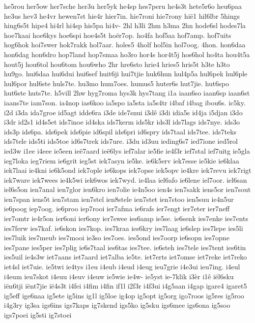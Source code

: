 he5rou
her5ow
her7sche
her3u
her5yk
he4sp
hes7peru
he4s3t
hete5r6o
heu6paa
he3us
hev3
he4vr
hewen7st
hie4r
hier7in.
hie7roni
hie7rony
hië1
hil6lbr
5hings
hing6s5t
hipe4
hi4rl
hi4sp
his5pa
hi4v-
2hl
h3li
2hm
h3ma
2hn
hode6sl
hodes7la
hoe7kaai
hoe6kys
hoe6spi
hoe4s5t
hoër7op.
ho4fa
hof5aa
hof7amp.
hof7uits
hog6hok
hoi7swer
hok7rakk
hol7aar.
holes5
4holf
hol5in
hol7oog.
4hon.
hon6daa
hon6dag
hon6dro
hop7land
hop7smaa
ho3ro
hor4s
hor4t5j
hos6hol
ho4ta
hou4t5a
hout5j
hou6tol
hou6tom
hou6who
2hr
hre6sto
hrie4
hries5
hris5t
h3te
h3to
hu9go.
hui6daa
hui6dui
hui6sef
huit6ji
hui7tjie
huk6hun
hul4p5a
hul6pek
hul6ple
hul6por
hul6ste
huls7te.
hu3mo
hum7oes.
humus5
huter6s
hut7jie.
hut6spo
hut6ste
huts7te.
h5vill
2hw
hyg7roma
hys3k
hys7tang
i1a
iaan6so
iaan6sp
iaan6st
iaans7te
iam7son.
ia4nop
ias6koo
ia5spo
ia5sta
ia5s4tr
i4baf
i4bag
ibou6s.
ic5ky.
i2d
i3da
ida7groe
id5agt
idde6ra
i3de
ide7snui
i3dê
i3di
idia5s
id4ja
i5djan
i3do
i3dr
id2s1
id4s5et
ids7inoe
id4ska
ids7kerm
ids5kr
ids3l
ids7lags
ids7nye.
ids3o
ids3p
ids6pa.
ids6pek
ids6pie
id6spil
ids6pri
id6spry
ids7taal
ids7tee.
ids7teks
ids7tele
ids5ti
ids5toe
id6s7trek
ids7ure.
i3du
id3uu
ieding6s7
ied7ione
ied5rol
ied3w
i1ee
i4eee
ie5een
ieë7aard
ieë6lys
ief7alar
ie5fie
ie4f3r
ief7stal
ief7uitg
ie5gla
ieg7loka
ieg7riem
ie6grit
ieg5st
iek7asyn
ie5ke.
ie6k5erv
iek7esse
ie5kie
ie6klaa
iek7laai
ie4kni
ie6k5ond
iek7ople
ie6kops
iek7opse
iek5opv
ie4kre
iek7revu
iek7rigt
iek7ware
iek7wees
ie4k5wi
iek6wos
iek7wyd.
ie4laa
iel6afo
ie6lene
iel7oor.
iel6san
iel6s5on
ien7anal
ien7glor
ien6kro
ien7olie
ie4n5oo
ien4s
ien7sakk
iens5or
ien7sout
ien7span
iens5t
ien7stam
ien7stel
ien8stele
ien7stet
ien7stoo
ien5suu
ie4n5ur
ie6poog
iep7oog.
ie6proo
iep7rooi
ier7afma
ie6rafs
ier7engt
ier7eter
ier7neff
ier7omtr
ie4r5on
ier6oni
ier6ony
ier7swee
ies6amp
ie5se.
ie6senk
ies7enke
ies7ents
ies7ferw
ies7kaf.
ie6skon
ies7kop.
ies7kraa
ies6kry
ies7laag
ie6slep
ies7lepe
ies5li
ies7luik
ies7meub
ies7mooi
ie3so
ies7oes.
ies5ond
ies7oorp
ie6sopn
ies7opne
ies7pane
ies5per
ies7plig
ie6s7taal
ies6tas
ies7tee.
ie6steh
ies7tele
ies7tent
ies6tin
ies5uil
ie4s3w
iet7aans
iet7aard
iet7alba
ie5te.
iet7erts
iet7omse
iet7reke
iet7reko
iet4sl
iet7uie.
ie5twi
ie4tys
i1eu
i4eub
i4eud
i4eug
ieu7grie
i4e3ui
ieu7ing.
i4eul
i4eum
ieu7skot
i4euu
i4euv
i4euw
ie5wie
ie4w-
ie5yst
ie-7klik
i3èr
i1ê
iël6sku
iën6tji
iënt7jie
ië4s3t
i4fei
i4fim
i4fin
if1l
i2f3r
i4f3ui
i4g5aan
i4gap
igare4
igaret5
ig5eff
ige6naa
ig5ete
ig5ins
ig1l
ig5loe
ig4op
ig5opt
ig5org
igo7roos
ig5res
ig5roo
i4g3ry
ig3sa
igs6ins
igs7kaps
ig7skend
igs5ko
ig5sku
igs6mee
igs6ona
ig5soo
igs7poei
ig5sti
ig7stoei
